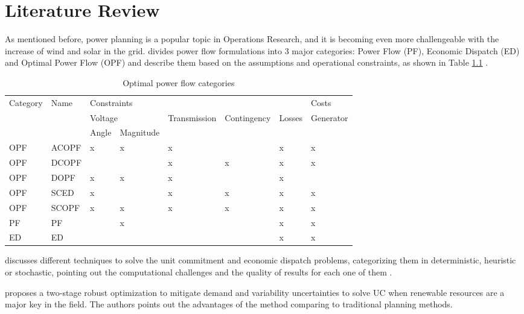 \documentclass[12pt,LUDisStyle,twosided]{book}
\begin{document}
\chapter{Literature Review}


As mentioned before, power planning is a popular topic in Operations Research, and it is becoming even more challengeable with the increase of wind and solar in the grid. \citeauthor{cain} \cite{cain} divides power flow formulations into 3 major categories: Power Flow (PF), Economic Dispatch (ED) and Optimal Power Flow (OPF) and describe them based on the assumptions and operational constraints, as shown in Table \ref{table:PowerSystemsCat} .

\begin{table}[h]
\centering
\caption{Optimal power flow categories \cite{cain}}
\label{table:PowerSystemsCat}
\begin{tabular}{|l|l|l|l|l|l|l|l|}
\hline
\multirow{3}{*}{Category} & \multirow{3}{*}{Name} & \multicolumn{5}{l|}{Constraints} & Costs \\ \cline{3-8} 
 &  & \multicolumn{2}{l|}{Voltage} & \multirow{2}{*}{Transmission} & \multirow{2}{*}{Contingency} & \multirow{2}{*}{Losses} & \multirow{2}{*}{Generator} \\ \cline{3-4}
 &  & Angle & Magnitude &  &  &  &  \\ \hline
OPF & ACOPF & x & x & x &  & x & x \\ \hline
OPF & DCOPF &  &  & x & x & x & x \\ \hline
OPF & DOPF & x & x & x &  & x &  \\ \hline
OPF & SCED & x &  & x & x & x & x \\ \hline
OPF & SCOPF & x & x & x & x & x & x \\ \hline
PF & PF &  & x &  &  & x & x \\ \hline
ED & ED &  &  &  &  & x & x \\ \hline
\end{tabular}
\end{table}


\citeauthor{yamin} \cite{yamin} discusses different techniques to solve the unit commitment and economic dispatch problems, categorizing them in deterministic, heuristic or stochastic, pointing out the computational challenges and the quality of results for each one of them . 

\citeauthor{bertsimas} \cite{bertsimas} proposes a two-stage robust optimization to mitigate demand and variability uncertainties to solve UC when renewable resources are a major key in the field. The authors points out the advantages of the method comparing to traditional planning methods. 
\end{document}
